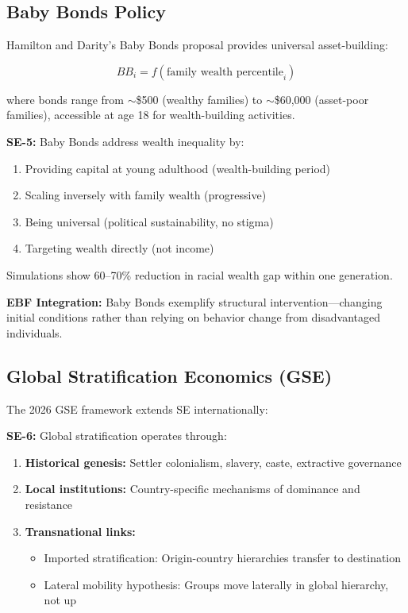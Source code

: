 \subsection{Baby Bonds Policy}
\label{subsec:se-baby-bonds}

Hamilton and Darity's Baby Bonds proposal provides universal asset-building:

\begin{equation}
BB_i = f(\text{family wealth percentile}_i)
\label{eq:se-baby-bonds}
\end{equation}

where bonds range from $\sim$\$500 (wealthy families) to $\sim$\$60,000 (asset-poor families), accessible at age 18 for wealth-building activities.

\begin{axiom}
\label{ax:se-5}
\textbf{SE-5:} Baby Bonds address wealth inequality by:
\begin{enumerate}
    \item Providing capital at young adulthood (wealth-building period)
    \item Scaling inversely with family wealth (progressive)
    \item Being universal (political sustainability, no stigma)
    \item Targeting wealth directly (not income)
\end{enumerate}
Simulations show 60--70\% reduction in racial wealth gap within one generation.
\end{axiom}

\textbf{EBF Integration:} Baby Bonds exemplify structural intervention---changing initial conditions rather than relying on behavior change from disadvantaged individuals.

\subsection{Global Stratification Economics (GSE)}
\label{subsec:se-gse}

The 2026 GSE framework \citep{PAP-aja_pena_lopez_2026_gse} extends SE internationally:

\begin{axiom}
\label{ax:se-6}
\textbf{SE-6:} Global stratification operates through:
\begin{enumerate}
    \item \textbf{Historical genesis:} Settler colonialism, slavery, caste, extractive governance
    \item \textbf{Local institutions:} Country-specific mechanisms of dominance and resistance
    \item \textbf{Transnational links:}
    \begin{itemize}
        \item Imported stratification: Origin-country hierarchies transfer to destination
        \item Lateral mobility hypothesis: Groups move laterally in global hierarchy, not up
    \end{itemize}
\end{enumerate}
\end{axiom}

